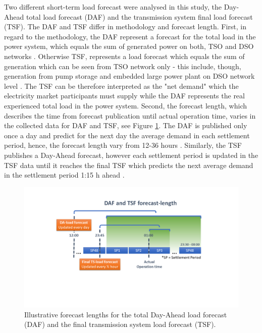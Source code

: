 \documentclass[energies,article,submit,moreauthors,pdftex]{Definitions/mdpi}
\begin{document}
Two different short-term load forecast were analysed in this study, the Day-Ahead total load forecast (DAF) and the transmission system final load forecast (TSF). The DAF and TSF differ in methodology and forecast length. First, in regard to the methodology, the DAF represent a forecast for the total load in the power system, which equals the sum of generated power on both, TSO and DSO networks \cite{ENTSO-E2020ENTSO-EPlatform}. Otherwise TSF, represents a load forecast which equals the sum of generation which can be seen from TSO network only - this include, though, generation from pump storage and embedded large power plant on DSO network level \cite{NationalGrid2020THE40}. The TSF can be therefore interpreted as the "net demand" which the electricity market participants must supply while the DAF represents the real experienced total load in the power system. Second, the forecast length, which describes the time from forecast publication until actual operation time, varies in the collected data for DAF and TSF, see Figure \ref{fig:forecast_length_explanation}. The DAF is published only once a day and predict for the next day the average demand in each settlement period, hence, the forecast length vary from 12-36 hours \cite{ENTSO-E2020ENTSO-EPlatform}. Similarly, the TSF publishes a Day-Ahead forecast, however each settlement period is updated in the TSF data until it reaches the final TSF which predicts the next average demand in the settlement period 1:15 h ahead \cite{ELEXON2020ELEXONBMRS}.

\begin{figure}[H]
\centering
\hspace{-25pt}
\includegraphics[trim={2cm 5cm 2 2cm},clip,width=1.1\textwidth]{Graphics/Forecast explanation.png}
\caption{Illustrative forecast lengths for the total Day-Ahead load forecast (DAF) and the final transmission system load forecast (TSF).}
\label{fig:forecast_length_explanation}
\end{figure} 
\end{document}
